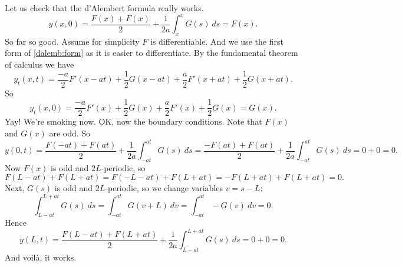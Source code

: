 Let us check that the d'Alembert formula really works.
\begin{equation*}
y(x,0) =
\frac{F(x) + F(x)}{2} + \frac{1}{2a} \int_{x}^{x} G(s) ~ds 
=
F(x) .
\end{equation*}
So far so good.  Assume for simplicity $F$ is differentiable.
And we use the first form of \eqref{dalemb:form} as it is
easier to differentiate.
By the fundamental theorem of calculus we have
\begin{equation*}
y_t(x,t) =
\frac{-a}{2} F'(x-at) + \frac{1}{2} G(x-at)
+
\frac{a}{2} F'(x+at) + \frac{1}{2} G(x+at) .
\end{equation*}
So
\begin{equation*}
y_t(x,0) =
\frac{-a}{2} F'(x) + \frac{1}{2} G(x)
+
\frac{a}{2} F'(x) + \frac{1}{2} G(x) = G(x) .
\end{equation*}
Yay!  We're smoking now.  OK\@, now the boundary conditions.  Note
that $F(x)$ and $G(x)$ are odd.  So
\begin{equation*}
y(0,t) =
\frac{F(-at) + F(at)}{2} + \frac{1}{2a} \int_{-at}^{at} G(s) ~ds 
=
\frac{-F(at) + F(at)}{2} + \frac{1}{2a} \int_{-at}^{at} G(s) ~ds 
= 0 + 0 = 0.
\end{equation*}
Now $F(x)$ is odd and $2L$-periodic, so
\begin{equation*}
F(L-at)+F(L+at)
= 
F(-L-at)+F(L+at)
=
-F(L+at)+F(L+at)
= 0 .
\end{equation*}
Next, $G(s)$ is odd and $2L$-periodic, so we change
variables $v = s-L$:
\begin{equation*}
\int_{L-at}^{L+at}
G(s)~ds
=
\int_{-at}^{at}
G(v+L)~dv
=
\int_{-at}^{at}
-G(v)~dv
=
0 .
\end{equation*}
Hence
\begin{equation*}
y(L,t) =
\frac{F(L-at) + F(L+at)}{2} + \frac{1}{2a} \int_{L-at}^{L+at} G(s) ~ds 
=
0 + 0  = 0.
\end{equation*}
And voil\`a, it works.

